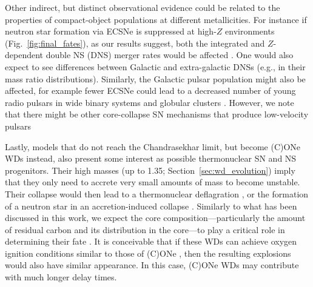 \documentclass[main.tex]{subfiles}
\begin{document}
Other indirect, but distinct observational evidence could be related to the properties of compact-object populations at different metallicities. For instance if neutron star formation via ECSNe is suppressed at high-$Z$ environments (Fig.~\ref{fig:final_fates}), as our results suggest, both the integrated and $Z$-dependent double NS (DNS) merger rates would be affected \citep{Mandel:2021abc}. One would also expect to see differences  between Galactic and extra-galactic DNSs (e.g., in their mass ratio distributions). Similarly, the Galactic pulsar population might also be affected, for example fewer ECSNe could  lead to a decreased number of young radio pulsars in wide binary systems and globular clusters \citep[][and references therein]{Antoniadis:2020gos,Willcox:2021kbg}. However, we note that there might be other core-collapse SN mechanisms that produce low-velocity pulsars \citep[see ][and references therein]{Antoniadis:2021dhe}

Lastly,  models that do not reach the Chandrasekhar limit, but become (C)ONe WDs instead, also 
present some interest as possible thermonuclear SN and NS progenitors. Their high masses (up to 1.35\msun; Section~\ref{sec:wd_evolution}) 
imply that they only need to accrete very small amounts of mass to become unstable. Their collapse would then lead to a thermonuclear deflagration
\citep{Meng:2014qta,Willcox:2016yyp,Bravo:2019fwh}, or the formation of a neutron star in an accretion-induced collapse \citep[e.g.,][]{Nomoto:1991abc,Tauris:2013zna,Ruiter:2018ouw,Wang:2020pzc}. Similarly to what has been discussed in this work, we expect the core composition---particularly the amount of residual carbon and its distribution in the core---to play a critical role in determining their fate \citep{brooks2017}. It is conceivable that if these WDs can achieve oxygen ignition conditions similar to those of (C)ONe \ias, then the resulting explosions would also have similar appearance. In this case, (C)ONe WDs may contribute \ias with much longer delay times.    
\end{document}
